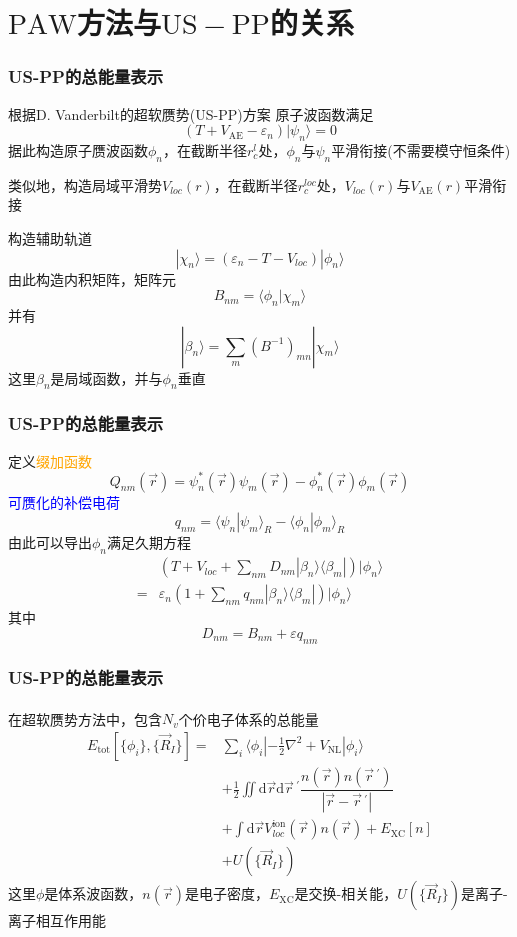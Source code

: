 \documentclass[cjk,slidestop,compress,mathserif,blue]{beamer}
\newcommand{\upcite}[1]{\hspace{0ex}\textsuperscript{\cite{#1}}} %
\begin{document}

\appendix
\section{$\mathrm{PAW}$方法与$\mathrm{US-PP}$的关系}
\frame
{
	\frametitle{\textrm{US-PP}的总能量表示}
	根据\textrm{D. Vanderbilt}的超软赝势(\textrm{US-PP})方案
	原子波函数满足$$(T+V_{\mathrm{AE}}-\varepsilon_n)|\psi_n\rangle=0$$
	据此构造原子赝波函数$\phi_n$，在截断半径$r_c^l$处，$\phi_n$与$\psi_n$平滑衔接(不需要模守恒条件)

	类似地，构造局域平滑势$V_{loc}(r)$，在截断半径$r_c^{loc}$处，$V_{loc}(r)$与$V_{\mathrm{AE}}(r)$平滑衔接
	
	构造辅助轨道
	$$|\chi_n\rangle=(\varepsilon_n-T-V_{loc})|\phi_n\rangle$$
	由此构造内积矩阵，矩阵元$$B_{nm}=\langle\phi_n|\chi_m\rangle$$
	并有$$|\beta_n\rangle=\sum_m(B^{-1})_{mn}|\chi_m\rangle$$
	这里$\beta_n$是局域函数，并与$\phi_n$垂直
}

\frame
{
	\frametitle{\textrm{US-PP}的总能量表示}
	定义\textcolor{orange}{缀加函数}$$Q_{nm}(\vec r)=\psi_n^{\ast}(\vec r)\psi_m(\vec r)-\phi_n^{\ast}(\vec r)\phi_m(\vec r)$$
	\textcolor{blue}{可赝化的补偿电荷}$$q_{nm}=\langle\psi_n|\psi_m\rangle_R-\langle\phi_n|\phi_m\rangle_R$$
	由此可以导出$\phi_n$满足久期方程
	\begin{displaymath}
		\begin{aligned}
			&\left(T+V_{loc}+\sum_{nm}D_{nm}|\beta_n\rangle\langle\beta_m|\right)|\phi_n\rangle\\
			=&\varepsilon_n\left(1+\sum_{nm}q_{nm}|\beta_n\rangle\langle\beta_m|\right)|\phi_n\rangle
		\end{aligned}
	\end{displaymath}
	其中$$D_{nm}=B_{nm}+\varepsilon q_{nm}$$
}

\frame
{
	\frametitle{\textrm{US-PP}的总能量表示}
	在超软赝势方法中，包含$N_v$个价电子体系的总能量\upcite{PRB47-10142_1993}
	\begin{displaymath}
		\begin{aligned}
			E_{\mathrm{tot}}[\{\phi_i\},\{\vec R_I\}]=&\sum_i\langle\phi_i|-\frac12\nabla^2+V_{\mathrm{NL}}|\phi_i\rangle\\
			&+\frac12\iint\mathrm{d}\vec r\mathrm{d}\vec r\,^{\prime}\dfrac{n(\vec r)n(\vec r\,^{\prime})}{|\vec r-\vec r\,^{\prime}|}\\
			&+\int\mathrm{d}\vec r V_{loc}^{\mathrm{ion}}(\vec r)n(\vec r)+E_{\mathrm{XC}}[n]\\
			&+U(\{\vec R_I\})
		\end{aligned}
	\end{displaymath}
	这里$\phi$是体系波函数，$n(\vec r)$是电子密度，$E_{\mathrm{XC}}$是交换-相关能，$U(\{\vec R_I\})$是离子-离子相互作用能
}
\end{document}

